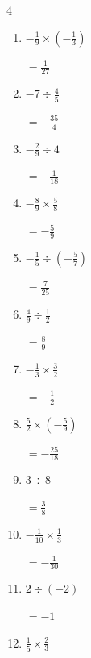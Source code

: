 \begin{multicols}{4}
\begin{enumerate}
        $\displaystyle =\frac{1}{30}$

  \item $\displaystyle -\frac{1}{9}\times{}\left(-\frac{1}{3}\right)$

        $\displaystyle =\frac{1}{27}$

  \item $\displaystyle -7\div{}\frac{4}{5}$

        $\displaystyle =-\frac{35}{4}$

  \item $\displaystyle -\frac{2}{9}\div{}4$

        $\displaystyle =-\frac{1}{18}$

\columnbreak %

  \item $\displaystyle -\frac{8}{9}\times{}\frac{5}{8}$

        $\displaystyle =-\frac{5}{9}$

  \item $\displaystyle -\frac{1}{5}\div{}\left(-\frac{5}{7}\right)$

        $\displaystyle =\frac{7}{25}$

  \item $\displaystyle \frac{4}{9}\div{}\frac{1}{2}$

        $\displaystyle =\frac{8}{9}$

  \item $\displaystyle -\frac{1}{3}\times{}\frac{3}{2}$

        $\displaystyle =-\frac{1}{2}$

  \item $\displaystyle \frac{5}{2}\times{}\left(-\frac{5}{9}\right)$

        $\displaystyle =-\frac{25}{18}$

  \item $\displaystyle 3\div{}8$

        $\displaystyle =\frac{3}{8}$

  \item $\displaystyle -\frac{1}{10}\times{}\frac{1}{3}$

        $\displaystyle =-\frac{1}{30}$

  \item $\displaystyle 2\div{}\left(-2\right)$

        $\displaystyle =-1$

  \item $\displaystyle \frac{1}{5}\times{}\frac{2}{3}$


\end{enumerate}
\end{multicols}
